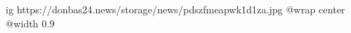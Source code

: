  
 
 
 
 

\ifcmt
  ig https://donbas24.news/storage/news/pdszfmeapwk1d1za.jpg
  @wrap center
  @width 0.9
\fi
